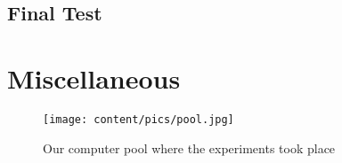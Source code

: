 \newpage

\subsection{Final Test}
\label{app:final_questions}

\begin{center}
  \label{fig:final_questions1}
\end{center}


%
{%
\begin{center}
    \label{fig:final_questions_rest}
\end{center}
}

\section{Miscellaneous}
\begin{figure}[h]
  \texttt{[image: content/pics/pool.jpg]}
  \caption{Our computer pool where the experiments took place}
  \label{fig:pool}
\end{figure}




